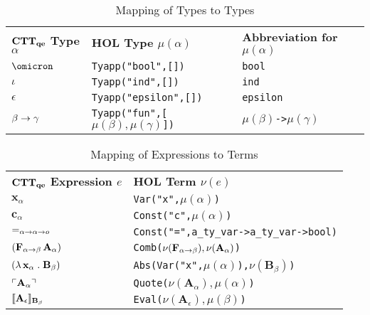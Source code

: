 \documentclass[fleqn]{llncs}
\begin{document}
\begin{table}
\bc
\begin{tabular}{|lll|}
\hline
\textbf{${\bf CTT_{qe}}$ Type $\alpha$} \hspace*{2ex}
  & \textbf{HOL Type $\mu(\alpha)$}
  & \textbf{Abbreviation for $\mu(\alpha)$}\\
$\omicron$ & \texttt{Tyapp("bool",[])} & \texttt{bool}\\
$\iota$ & \texttt{Tyapp("ind",[])} & \texttt{ind}\\
$\epsilon$ & \texttt{Tyapp("epsilon",[])} & \texttt{epsilon}\\
$\beta \rightarrow \gamma$ 
  & \texttt{Tyapp("fun",[\mbox{$\mu(\beta),\mu(\gamma)$}])} \hspace*{2ex}
  & \texttt{\mbox{$\mu(\beta)$}->\mbox{$\mu(\gamma)$}}\\  
\hline
\end{tabular}
\ec
\caption{Mapping of {\churchqe} Types to {\HOL} Types}\label{tab:types} 
\end{table}

\begin{table}
\bc
\begin{tabular}{|ll|}
\hline
\textbf{${\bf CTT_{qe}}$ Expression $e$} \hspace*{2ex}
  & \textbf{HOL Term $\nu(e)$}\\
$\textbf{x}_\alpha$
  & \texttt{Var("x",\mbox{$\mu(\alpha)$})}\\
$\textbf{c}_\alpha$
  & \texttt{Const("c",\mbox{$\mu(\alpha)$})}\\
$\mbox{\sf =}_{\alpha \rightarrow \alpha \rightarrow o}$
  & \texttt{Const("=",\texttt{a\_ty\_var->a\_ty\_var->bool})}\\
$(\textbf{F}_{\alpha \rightarrow \beta} \, \textbf{A}_\alpha)$
  & \texttt{Comb(\mbox{\rm $\nu(\textbf{F}_{\alpha \rightarrow \beta}),\nu(\textbf{A}_\alpha)$})}\\
$(\lambda\, \textbf{x}_\alpha \mathrel. \textbf{B}_\beta)$
  & \texttt{Abs(Var("x",\mbox{$\mu(\alpha)$}),\mbox{\rm $\nu(\textbf{B}_\beta)$})}\\
$\ulcorner\textbf{A}_\alpha\urcorner$
  & \texttt{Quote(\mbox{\rm $\nu(\textbf{A}_\alpha),\mu(\alpha)$})}\\
$\llbracket\textbf{A}_\epsilon\rrbracket_{{\bf B}_\beta}$
  & \texttt{Eval(\mbox{\rm $\nu(\textbf{A}_\epsilon),\mu(\beta)$})}\\
\hline
\end{tabular}
\ec
\caption{Mapping of {\churchqe} Expressions to {\HOL} Terms}\label{tab:expressions} 
\end{table}
\end{document}
